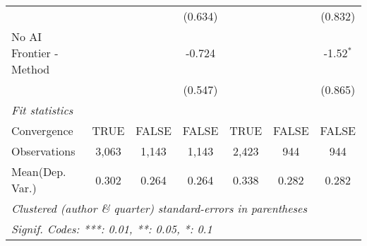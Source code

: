 \begin{tabular}{lcccccc}
                           &               &               & (0.634)       &               &               & (0.832)\\   
   No AI Frontier - Method &               &               & -0.724        &               &               & -1.52$^{*}$\\   
                           &               &               & (0.547)       &               &               & (0.865)\\   
   \midrule
   \emph{Fit statistics}\\
   Convergence             &TRUE           & FALSE         & FALSE         & TRUE          & FALSE         & FALSE\\  
   Observations            & 3,063         & 1,143         & 1,143         & 2,423         & 944           & 944\\  
Mean(Dep. Var.) & 0.302 & 0.264 & 0.264 & 0.338 & 0.282 & 0.282 \\
   \midrule \midrule
   \multicolumn{7}{l}{\emph{Clustered (author \& quarter) standard-errors in parentheses}}\\
   \multicolumn{7}{l}{\emph{Signif. Codes: ***: 0.01, **: 0.05, *: 0.1}}\\
\end{tabular}
\par\endgroup
